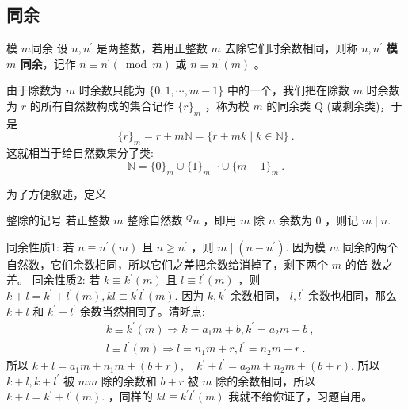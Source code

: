 
\subsection{同余}
\begin{definition}{模 $m$同余}
设 $n, n^{\prime}$ 是两整数，若用正整数 $m$ 去除它们时余数相同，则称 $n, n^{\prime}$ \textbf{模 $m$ 同余}，记作 $n \equiv n^{\prime}(\bmod m)$ 或 $n \equiv n^{\prime}(m)$ 。 
\end{definition} 
由于除数为 $m$ 时余数只能为 $\{0,1, \cdots, m-1\}$ 中的一个，我们把在除数 $m$ 时余数为 $r$ 的所有自然数构成的集合记作 $\{r\}_m$ ，称为模 $m$ 的同余类 $\mathrm{Q}$ (或剩余类)，于是
\begin{equation}
\{r\}_m=r+m \mathbb{N}=\{r+m k \mid k \in \mathbb{N}\}~.
\end{equation}
这就相当于给自然数集分了类:
\begin{equation}
\mathbb{N}=\{0\}_m \cup\{1\}_m \cdots \cup\{m-1\}_m~.
\end{equation}

为了方便叙述，定义
\begin{definition}{整除的记号}
若正整数 $m$ 整除自然数 ${ }^Q n$ ，即用 $m$ 除 $n$ 余数为 0 ，则记 $m \mid n$.
\end{definition}
同余性质1: 若 $n \equiv n^{\prime}(m)$ 且 $n \geq n^{\prime}$ ，则 $m \mid\left(n-n^{\prime}\right)$.
因为模 $m$ 同余的两个自然数，它们余数相同，所以它们之差把余数给消掉了，剩下两个 $m$ 的倍 数之差。
同余性质2: 若 $k \equiv k^{\prime}(m)$ 且 $l \equiv l^{\prime}(m)$ ，则 $k+l=k^{\prime}+l^{\prime}(m), k l \equiv k^{\prime} l^{\prime}(m)$.
因为 $k, k^{\prime}$ 余数相同， $l, l^{\prime}$ 余数也相同，那么 $k+l$ 和 $k^{\prime}+l^{\prime}$ 余数当然相同了。清晰点:
\begin{equation}
\begin{aligned}
& k \equiv k^{\prime}(m) \Rightarrow k=a_1 m+b, k^{\prime}=a_2 m+b~, \\
& l \equiv l^{\prime}(m) \Rightarrow l=n_1 m+r, l^{\prime}=n_2 m+r~.
\end{aligned}
\end{equation}
所以 $k+l=a_1 m+n_1 m+(b+r), \quad k^{\prime}+l^{\prime}=a_2 m+n_2 m+(b+r).$
所以 $k+l, k+l^{\prime}$ 被 $m m$ 除的余数和 $b+r$ 被 $m$ 除的余数相同，所以 $k+l=k^{\prime}+l^{\prime}(m).$
，同样的 $k l \equiv k^{\prime} l^{\prime}(m)$ 我就不给你证了，习题自用。